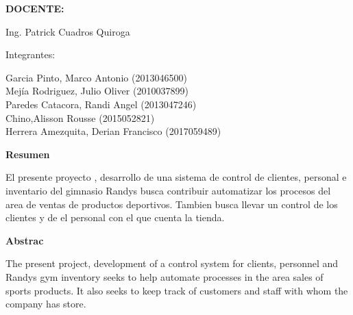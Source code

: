 \documentclass[12pt,letterpaper]{article}
\begin{document}
\begin{titlepage}
\begin{center}
\vspace*{0.3in}
\begin{Large}
\textbf{DOCENTE:} \\
\end{Large}

\vspace*{0.1in}
\begin{large}
Ing. Patrick Cuadros Quiroga\\
\end{large}

\vspace*{0.2in}
\vspace*{0.1in}
\begin{large}
Integrantes: \\
\begin{flushleft}
Garcia Pinto, Marco Antonio		\hfill	(2013046500) \\
Mej\'ia Rodriguez, Julio Oliver         	\hfill	(2010037899) \\
Paredes Catacora, Randi Angel   	\hfill	(2013047246) \\
Chino,Alisson Rousse		\hfill	(2015052821) \\
Herrera Amezquita, Derian Francisco		\hfill	(2017059489) \\

\end{flushleft}
\end{large}
\end{center}

\end{titlepage}



\tableofcontents %
\thispagestyle{empty} %
\newpage
\setcounter{page}{1} %


\begin{center}
    \textbf{\Large Resumen}  
\end{center}

El presente proyecto , desarrollo de una sistema de control de clientes, personal e
inventario del gimnasio Randys busca  contribuir automatizar los procesos del area 
de ventas de productos deportivos.
Tambien busca llevar un control de los clientes y de el personal con el que cuenta la 
tienda. 
\\
\begin{center}
    \textbf{\Large Abstrac}
\end{center}

The present project, development of a control system for clients, personnel and
Randys gym inventory seeks to help automate processes in the area
sales of sports products.
It also seeks to keep track of customers and staff with whom the company has
store.
\end{document}
